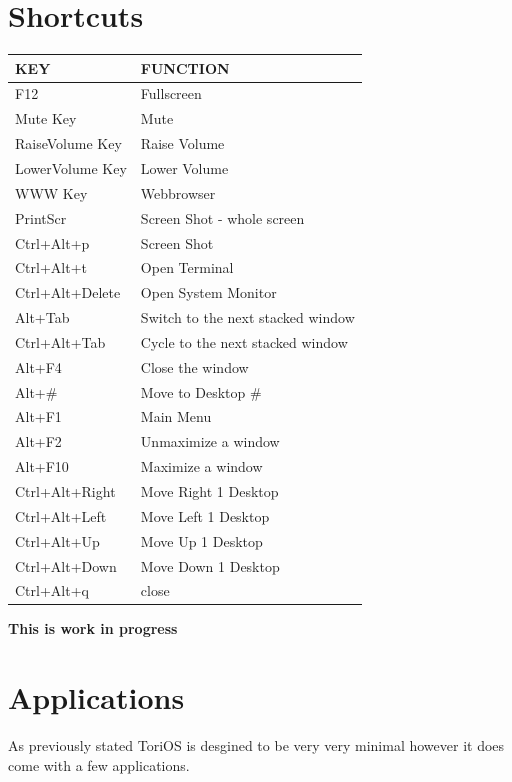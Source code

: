 \documentclass[12pt,a4paper]{book}
\begin{document}
\chapter{Shortcuts}
\begin{center}\begin{tabular}{|l|l|}
\hline \textbf{KEY} & \textbf{FUNCTION} \\
\hline F12 & Fullscreen \\
\hline Mute Key & Mute \\
\hline RaiseVolume Key & Raise Volume \\
\hline LowerVolume Key & Lower Volume \\
\hline WWW Key & Webbrowser \\
\hline PrintScr & Screen Shot - whole screen \\
\hline Ctrl+Alt+p &	Screen Shot \\
\hline Ctrl+Alt+t &	 Open Terminal \\
\hline Ctrl+Alt+Delete & Open System Monitor \\
\hline Alt+Tab & Switch to the next stacked window \\
\hline Ctrl+Alt+Tab & Cycle to the next stacked window \\
\hline Alt+F4 &	Close the window \\
\hline Alt+\# & Move to Desktop \# \\
\hline Alt+F1 &	Main Menu \\
\hline Alt+F2 & Unmaximize a window \\
\hline Alt+F10 & Maximize a window \\
\hline Ctrl+Alt+Right & Move Right 1 Desktop \\
\hline Ctrl+Alt+Left & Move Left 1 Desktop \\
\hline Ctrl+Alt+Up & Move Up 1 Desktop \\
\hline Ctrl+Alt+Down & Move Down 1 Desktop \\
\hline Ctrl+Alt+q &	close \\
\hline \end{tabular}
\end{center}

\textbf{This is work in progress}


\chapter{Applications}
As previously stated ToriOS is desgined to be very very minimal however it does come with a few applications. 
\end{document}
